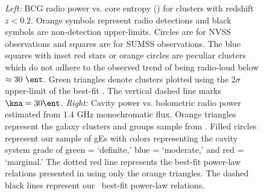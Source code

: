 \documentclass[11pt]{article}
\begin{document}
\begin{center}
\begin{figure}[htp]
    \caption{\footnotesize{\it{Left:}} BCG radio power vs. core
    entropy (\kna) for clusters with redshift $z < 0.2$. Orange
    symbols represent radio detections and black symbols are
    non-detection upper-limits. Circles are for NVSS observations and
    squares are for SUMSS observations. The blue squares with inset
    red stars or orange circles are peculiar clusters which do not
    adhere to the observed trend of being radio-loud below $\approx
    30~\ent$.  Green triangles denote clusters plotted using the
    2$\sigma$ upper-limit of the best-fit \kna. The vertical dashed
    line marks $\kna = 30 \ent$. {\it{Right:}} Cavity power
    vs. bolometric radio power estimated from 1.4 GHz monochromatic
    flux. Orange triangles represent the galaxy clusters and groups
    sample from \cite{birzan08}. Filled circles represent our sample
    of gEs with colors representing the cavity system grade of green =
    `definite,' blue = `moderate,' and red = `marginal.' The dotted
    red line represents the best-fit power-law relations presented in
    \cite{birzan08} using only the orange triangles. The dashed black
    lines represent our \bces\ best-fit power-law relations.}
    \label{fig:figs} \end{figure}
\end{center}



 
\end{document}
